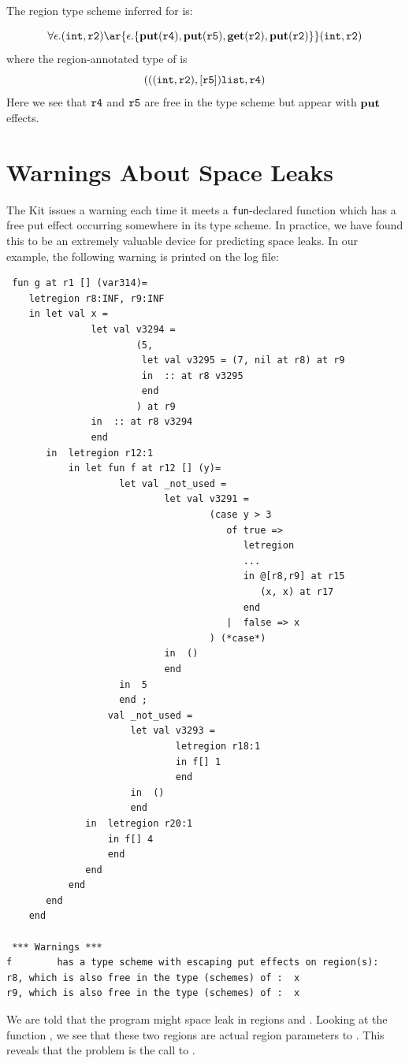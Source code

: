 \documentclass[12pt]{book}
\begin{document}
The region type scheme inferred for  is:

$$\forall\epsilon.(\boxml{int},\boxml{r2})\ar{\epsilon.\{\Put(\mathtt{r4}),\Put(\mathtt{r5}), \Get(\mathtt{r2}),\Put(\mathtt{r2})\}}
  (\boxml{int},\boxml{r2})$$
where the region-annotated type of  is
$$(((\hbox{\tt int},\hbox{\tt r2}),[\hbox{\tt r5}])\hbox{\tt list},\hbox{\tt r4})$$
Here we see that $\hbox{\tt r4}$ and $\hbox{\tt r5}$ are free in the type scheme but appear with $\mathop{\bf put}\nolimits$ effects.

\section{Warnings About Space Leaks}
The Kit issues a warning each time it meets a {\tt fun}-declared
function which has a free put effect occurring somewhere in its type
scheme. In practice, we have found this to be an extremely valuable
device for predicting space leaks. In our example, the following
warning is printed on the log file:
\begin{verbatim}
 fun g at r1 [] (var314)= 
    letregion r8:INF, r9:INF 
    in let val x = 
               let val v3294 = 
                       (5, 
                        let val v3295 = (7, nil at r8) at r9
                        in  :: at r8 v3295
                        end 
                       ) at r9
               in  :: at r8 v3294
               end 
       in  letregion r12:1 
           in let fun f at r12 [] (y)= 
                    let val _not_used = 
                            let val v3291 = 
                                    (case y > 3 
                                       of true => 
                                          letregion 
                                          ... 
                                          in @[r8,r9] at r15 
                                             (x, x) at r17 
                                          end
                                       |  false => x
                                    ) (*case*) 
                            in  ()
                            end 
                    in  5
                    end ; 
                  val _not_used = 
                      let val v3293 = 
                              letregion r18:1 
                              in f[] 1 
                              end
                      in  ()
                      end 
              in  letregion r20:1 
                  in f[] 4 
                  end
              end  
           end
       end  
    end

 *** Warnings ***
f        has a type scheme with escaping put effects on region(s): 
r8, which is also free in the type (schemes) of :  x
r9, which is also free in the type (schemes) of :  x
\end{verbatim}
We are told that the program might space
leak in regions  and . Looking at the 
function , we see that these two regions are actual
region parameters to . This reveals that the problem is the
call to .
\end{document}
